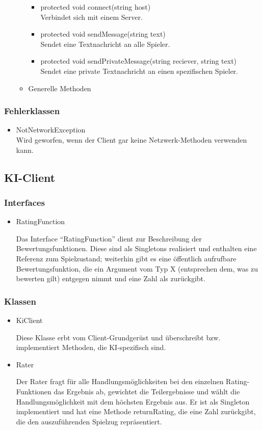 \documentclass[a4paper,10pt]{article}
\begin{document}
\begin{itemize}
\begin{itemize}
\begin{itemize}
\item protected void connect(string host) \\
Verbindet sich mit einem Server.
\item protected void sendMessage(string text) \\
Sendet eine Textnachricht an alle Spieler.
\item protected void sendPrivateMessage(string reciever, string text) \\
Sendet eine private Textnachricht an einen spezifischen Spieler.
\end{itemize} %
\item Generelle Methoden
\end{itemize} %
\end{itemize} %
\subsubsection{Fehlerklassen}
\begin{itemize}
\item NotNetworkException \\
Wird geworfen, wenn der Client gar keine Netzwerk-Methoden verwenden kann.
\end{itemize} %

\subsection{KI-Client}
\subsubsection{Interfaces}
\begin{itemize}
\item RatingFunction

Das Interface "`RatingFunction"' dient zur Beschreibung der Bewertungsfunktionen. Diese sind als Singletons realisiert und enthalten eine Referenz zum Spielzustand; weiterhin gibt es eine öffentlich aufrufbare Bewertungsfunktion, die ein Argument vom Typ X (entsprechen dem, was zu bewerten gilt) entgegen nimmt und eine Zahl als zurückgibt.
\end{itemize}
\subsubsection{Klassen}
\begin{itemize}
\item KiClient

Diese Klasse erbt vom Client-Grundgerüst und überschreibt bzw. implementiert Methoden, die KI-spezifisch sind.
\item Rater

Der Rater fragt für alle Handlungsmöglichkeiten bei den einzelnen Rating-Funktionen das Ergebnis ab, gewichtet die Teilergebnisse und wählt die Handlungsmöglichkeit mit dem höchsten Ergebnis aus. Er ist als Singleton implementiert und hat eine Methode returnRating, die eine Zahl zurückgibt, die den auszuführenden Spielzug repräsentiert.
\end{itemize}
\end{document}
